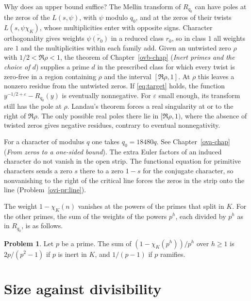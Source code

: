 \documentclass[reqno]{amsart}
\newcounter{chap}
\theoremstyle{definition}
\newtheorem{problem}{Problem}[section]
\begin{document}
Why does an upper bound suffice?  The Mellin transform of
\(R_{q_0}\) can have poles at the zeros of the \(L(s, \psi)\), with \(\psi\)
modulo \(q_0\), and at the zeros of their twists \(L(s, \psi\chi_K)\),
whose multiplicities enter with opposite signs.  Character orthogonality
gives weights \(\overline{\psi(r_0)}\) in a reduced class \(r_0\), so in class \(1\)
all weights are \(1\) and the multiplicities within each family add.
Given an untwisted zero \(\rho\) with
\(1/2 < \Re \rho < 1\), the theorem of Chapter~\ref{ovb-chap}
(\emph{Inert primes and the choice of \(d\)}) supplies a prime \(d\) in the
prescribed class for which every twist is zero-free in a region containing
\(\rho\) and the interval \([\Re \rho, 1]\).  At \(\rho\) this leaves
a nonzero residue from the untwisted zeros.  If \eqref{eq:target} holds, the function
\(y^{-1/2+\varepsilon} - R_{q_0}(y)\) is eventually nonnegative.
For \(\varepsilon\) small enough, its transform still has the pole
at \(\rho\).  Landau's theorem forces a real singularity at or to
the right of \(\Re \rho\).  The only possible real poles there lie in
\([\Re \rho,1)\), where the absence of twisted zeros gives negative
residues, contrary to eventual nonnegativity.

For a character of modulus \(q\) one takes \(q_0 = 18480q\).
See Chapter~\ref{ova-chap} (\emph{From zeros to a one-sided bound}).
The extra Euler factors of an induced character do not vanish in the
open strip.  The functional equation for primitive characters sends a
zero \(s\) there to a zero \(1-s\) for the conjugate character, so
nonvanishing to the right of the critical line forces the zeros in the
strip onto the line (Problem~\ref{ovi-pr:line}).

The weight \(1 - \chi_K(n)\) vanishes at the powers of the primes
that split in \(K\).  For the other primes, the sum of the weights
of the powers \(p^h\), each divided by \(p^h\) as in
\(R_{q_0}\), is as follows.

\begin{problem}\label{pr:weight}
  Let \(p\) be a prime.  The sum of \((1 - \chi_K(p^h))/p^h\) over
  \(h \ge 1\) is \(2p/(p^2 - 1)\) if \(p\) is inert in \(K\), and
  \(1/(p - 1)\) if \(p\) ramifies.
\end{problem}

\section{Size against divisibility}\label{sec:divisibility}
\end{document}
